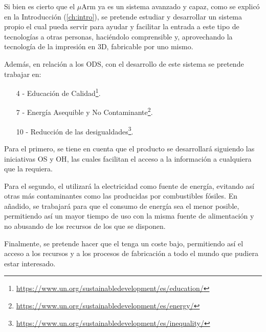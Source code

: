 Si bien es cierto que el $\mu$Arm ya es un sistema avanzado y capaz, como se explicó 
en la Introducción (\ref{ch:intro}), se pretende estudiar y desarrollar un sistema 
propio el cual pueda servir para ayudar y facilitar la entrada a este tipo de 
tecnologías a otras personas, haciéndolo comprensible y, aprovechando la tecnología 
de la impresión en 3D, fabricable por uno mismo.

Además, en relación a los \ac{ODS}, con el desarrollo de este sistema se pretende 
trabajar en:

\begin{itemize}
    \item [4 -] Educación de Calidad\footnote{\url{https://www.un.org/sustainabledevelopment/es/education/}}.
    \item [7 -] Energía Asequible y No Contaminante\footnote{\url{https://www.un.org/sustainabledevelopment/es/energy/}}.
    \item [10 -] Reducción de las desigualdades\footnote{\url{https://www.un.org/sustainabledevelopment/es/inequality/}}.
\end{itemize}

Para el primero, se tiene en cuenta que el producto se desarrollará siguiendo las 
iniciativas \ac{OS} y \ac{OH}, las cuales facilitan el acceso a la información a 
cualquiera que la requiera. %

Para el segundo, el \pArm{} utilizará la electricidad como fuente de energía, evitando
así otras más contaminantes como las producidas por combustibles fósiles. En añadido, 
se trabajará para que el consumo de energía sea el menor posible, permitiendo así un 
mayor tiempo de uso con la misma fuente de alimentación y no abusando de los recursos 
de los que se disponen.

Finalmente, se pretende hacer que el \pArm{} tenga un coste bajo, permitiendo así el 
acceso a los recursos y a los procesos de fabricación a todo el mundo que pudiera 
estar interesado. %
